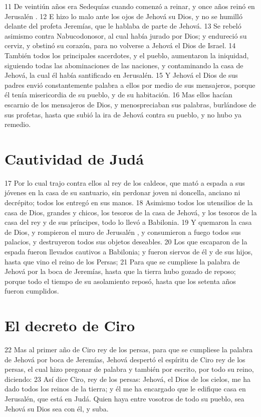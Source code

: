  
11 De veintiún años era Sedequías cuando comenzó a reinar, y once años reinó en Jerusalén .
12 E hizo lo malo ante los ojos de Jehová su Dios, y no se humilló delante del profeta Jeremías, que le hablaba de parte de Jehová.
13 Se rebeló asimismo contra Nabucodonosor, al cual había jurado por Dios; y endureció su cerviz, y obstinó su corazón, para no volverse a Jehová el Dios de Israel.
14 También todos los principales sacerdotes, y el pueblo, aumentaron la iniquidad, siguiendo todas las abominaciones de las naciones, y contaminando la casa de Jehová, la cual él había santificado en Jerusalén. 
15 Y Jehová el Dios de sus padres envió constantemente palabra a ellos por medio de sus mensajeros, porque él tenía misericordia de su pueblo, y de su habitación.
16 Mas ellos hacían escarnio de los mensajeros de Dios, y menospreciaban sus palabras, burlándose de sus profetas, hasta que subió la ira de Jehová contra su pueblo, y no hubo ya remedio.
\section*{Cautividad de Judá }


17 Por lo cual trajo contra ellos al rey de los caldeos, que mató a espada a sus jóvenes en la casa de su santuario, sin perdonar joven ni doncella, anciano ni decrépito; todos los entregó en sus manos.
18 Asimismo todos los utensilios de la casa de Dios, grandes y chicos, los tesoros de la casa de Jehová, y los tesoros de la casa del rey y de sus príncipes, todo lo llevó a Babilonia.
19 Y quemaron la casa de Dios, y rompieron el muro de Jerusalén , y consumieron a fuego todos sus palacios, y destruyeron todos sus objetos deseables.
20 Los que escaparon de la espada fueron llevados cautivos a Babilonia; y fueron siervos de él y de sus hijos, hasta que vino el reino de los Persas;
21 Para que se cumpliese la palabra de Jehová por la boca de Jeremías, hasta que la tierra hubo gozado de reposo; porque todo el tiempo de su asolamiento reposó, hasta que los setenta años fueron cumplidos. 
\section*{El decreto de Ciro }


22 Mas al primer año de Ciro rey de los persas, para que se cumpliese la palabra de Jehová por boca de Jeremías, Jehová despertó el espíritu de Ciro rey de los persas, el cual hizo  pregonar de palabra y también por escrito, por todo su reino,  diciendo:
23 Así dice Ciro, rey de los persas: Jehová, el Dios de los cielos, me ha dado todos los reinos de la tierra; y él me ha encargado que le edifique casa en Jerusalén, que está en Judá. Quien haya entre vosotros de todo su pueblo, sea Jehová su Dios sea con él, y suba.

